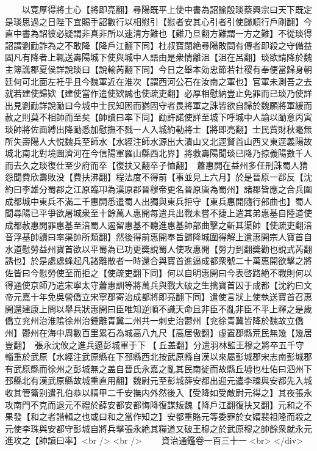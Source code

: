 　　以寛厚得將士心【將即亮翻】尋陽既平上使中書為詔諭殷琰蔡興宗曰天下既定是琰思過之日陛下宜賜手詔數行以相慰引【慰者安其心引者引使歸順行戶剛翻】今直中書為詔彼必疑謂非真非所以速清方難也【難乃旦翻方難謂一方之難】不從琰得詔謂劉勔詐為之不敢降【降戶江翻下同】杜叔寶閉絶尋陽敗問有傳者即殺之守備益固凡有降者上輒送壽陽城下使與城中人語由是衆情離沮【沮在呂翻】琰欲請降於魏主簿譙郡夏侯詳說琰曰【說輸芮翻下同】今日之舉本効忠節若社稷有奉便當歸身朝廷何可北面左衽乎且今魏軍近在淮次【謂西河公石在汝南之軍也】官軍未測吾之去就若建使歸欵【建使當作遣使欵誠也使疏吏翻】必厚相慰納豈止免罪而已琰乃使詳出見劉勔詳說勔曰今城中士民知困而猶固守者畏將軍之誅皆欲自歸於魏願將軍緩而赦之則莫不相帥而至矣【帥讀曰率下同】勔許諾使詳至城下呼城中人諭以勔意丙寅琰帥將佐面縛出降勔悉加慰撫不戮一人入城約勒將士【將即亮翻】士民貲財秋毫無所失壽陽人大悦魏兵至師水【水經注師水源出大潰山又北逕賢首山西又東逕義陽故城北南北對境圖濟河在今信陽軍羅山縣西北界】將救壽陽聞琰已降乃掠義陽數千人而去久之琰復仕至少府而卒【復扶又翻卒子恤翻】　蕭惠開在益州多任刑誅蜀人猜怨聞費欣壽敗没【費扶沸翻】程法度不得前【事並見上六月】於是晉原一郡反【沈約曰李雄分蜀郡之江原臨卭為漢原郡晉穆帝更名晉原唐為蜀州】諸郡皆應之合兵圍成都城中東兵不滿二千惠開悉遣蜀人出獨與東兵拒守【東兵惠開隨行部曲也】蜀人聞尋陽已平爭欲屠城衆至十餘萬人惠開每遣兵出戰未嘗不捷上遣其弟惠基自陸道使成都赦惠開罪惠基至涪蜀人遏留惠基不聽進惠基帥部曲擊之斬其渠帥【使疏吏翻涪音浮基帥讀曰率渠帥所類翻】然後得前惠開奉旨歸降城圍得解上遣惠開宗人寶首自水道慰勞益州寶首欲以平蜀為已功更奬說蜀人使攻惠開【勞力到翻奬勸也說式芮翻誘也】於是處處蜂起凡諸離散者一時還合與寶首進逼成都衆號二十萬惠開欲擊之將佐皆曰今慰勞使至而拒之【使疏吏翻下同】何以自明惠開曰今表啓路絶不戰則何以得通使京師乃遣宋寧太守蕭惠訓等將萬兵與戰大破之生擒寶首囚于成都【沈約曰文帝元嘉十年免吳營僑立宋寧郡寄治成都將即亮翻下同】遣使言狀上使執送寶首召惠開還建康上問以舉兵狀惠開曰臣唯知逆順不識天命且非臣不亂非臣不平上釋之是歲僑立兖州治淮隂徐州治鍾離青冀二州共一刺史治鬱州【兖徐青冀皆降於魏故立僑州】鬱州在海中周數百里累石為城高八九尺【高居傲翻】虚置郡縣荒民無幾【幾居豈翻】　張永沈攸之進兵逼彭城軍于下【丘盖翻】分遣羽林監王穆之將卒五千守輜重於武原【水經注武原縣在下邳縣西北按武原縣自漢以來屬彭城郡宋志南彭城郡有武原縣而徐州之彭城無之盖自晉氏永嘉之亂其民南徙而故縣丘墟也杜佑曰泗州下邳縣北有漢武原縣故城重直用翻】魏尉元至彭城薛安都出迎元遣李璨與安都先入城收其管籥别遣孔伯恭以精甲二千安撫内外然後入【受降如受敵尉元得之】其夜張永攻南門不克而退元不禮於薛安都安都悔降復謀叛魏【降戶江翻復扶又翻】元和之不果發【和之者諧輯之也或曰和之當作知之】安都重賂元等委罪於女婿裴祖隆而殺之元使李珠與安都守彭城自將兵擊張永絶其糧道又破王穆之於武原穆之帥餘衆就永元進攻之【帥讀曰率】<br />
<br />
　　資治通鑑卷一百三十一  <br>
   </div> 

